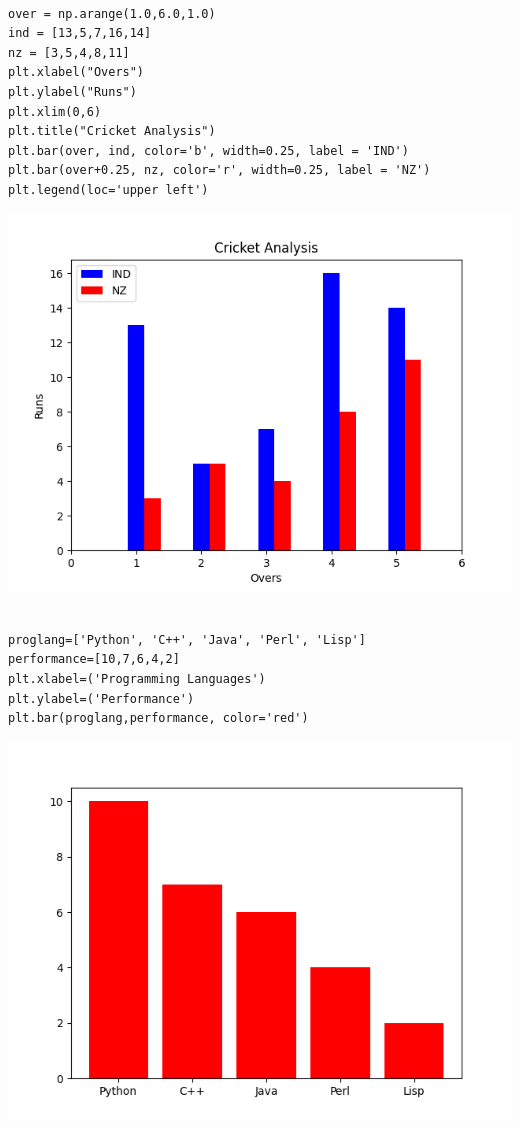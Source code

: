 \documentclass[11pt]{article}
\begin{document}
\begin{verbatim}

over = np.arange(1.0,6.0,1.0)
ind = [13,5,7,16,14]
nz = [3,5,4,8,11]
plt.xlabel("Overs")
plt.ylabel("Runs")
plt.xlim(0,6)
plt.title("Cricket Analysis")
plt.bar(over, ind, color='b', width=0.25, label = 'IND')
plt.bar(over+0.25, nz, color='r', width=0.25, label = 'NZ')
plt.legend(loc='upper left')

\end{verbatim}

\begin{center}
\includegraphics[width=.9\linewidth]{fig4.png}
\end{center}

\begin{verbatim}

proglang=['Python', 'C++', 'Java', 'Perl', 'Lisp']
performance=[10,7,6,4,2]
plt.xlabel=('Programming Languages')
plt.ylabel=('Performance')
plt.bar(proglang,performance, color='red')

\end{verbatim}

\begin{center}
\includegraphics[width=.9\linewidth]{fig5.png}
\end{center}
\end{document}
